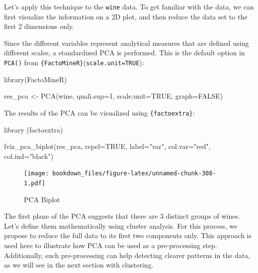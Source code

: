 \documentclass[
]{krantz}
\makeatletter
\newenvironment{Shaded}{\begin{snugshade}}{\end{snugshade}}
\newcommand{\AttributeTok}[1]{\textcolor[rgb]{0.61,0.61,0.61}{#1}}
\newcommand{\ConstantTok}[1]{\textcolor[rgb]{0,0,0}{#1}}
\newcommand{\DecValTok}[1]{\textcolor[rgb]{0.06,0.06,0.06}{#1}}
\newcommand{\FunctionTok}[1]{\textcolor[rgb]{0,0,0}{#1}}
\newcommand{\NormalTok}[1]{#1}
\newcommand{\OtherTok}[1]{\textcolor[rgb]{0.37,0.37,0.37}{#1}}
\newcommand{\StringTok}[1]{\textcolor[rgb]{0.5,0.5,0.5}{#1}}
\newenvironment{kframe}{%
\medskip{}
\setlength{\fboxsep}{.8em}
 \def\at@end@of@kframe{}%
 \ifinner\ifhmode%
  \def\at@end@of@kframe{\end{minipage}}%
  \begin{minipage}{\columnwidth}%
 \fi\fi%
 \def\FrameCommand##1{\hskip\@totalleftmargin \hskip-\fboxsep
 \colorbox{shadecolor}{##1}\hskip-\fboxsep
     \hskip-\linewidth \hskip-\@totalleftmargin \hskip\columnwidth}%
 \MakeFramed {\advance\hsize-\width
   \@totalleftmargin\z@ \linewidth\hsize
   \@setminipage}}%
 {\par\unskip\endMakeFramed%
 \at@end@of@kframe}
\renewenvironment{Shaded}{\begin{kframe}}{\end{kframe}}
\makeatother
\begin{document}
Let's apply this technique to the \texttt{wine} data. To get familiar with the data, we can first visualize the information on a 2D plot, and then reduce the data set to the first 2 dimensions only.

Since the different variables represent analytical measures that are defined using different scales, a standardized PCA is performed. This is the default option in \texttt{PCA()} from \texttt{\{FactoMineR\}}(\texttt{scale.unit=TRUE}):

\begin{Shaded}
\begin{Highlighting}[]
\FunctionTok{library}\NormalTok{(FactoMineR)}

\NormalTok{res\_pca }\OtherTok{\textless{}{-}} \FunctionTok{PCA}\NormalTok{(wine, }\AttributeTok{quali.sup=}\DecValTok{1}\NormalTok{, }\AttributeTok{scale.unit=}\ConstantTok{TRUE}\NormalTok{, }\AttributeTok{graph=}\ConstantTok{FALSE}\NormalTok{)}
\end{Highlighting}
\end{Shaded}

The results of the PCA can be visualized using \texttt{\{factoextra\}}:

\begin{Shaded}
\begin{Highlighting}[]
\FunctionTok{library}\NormalTok{ (factoextra)}

\FunctionTok{fviz\_pca\_biplot}\NormalTok{(res\_pca, }\AttributeTok{repel=}\ConstantTok{TRUE}\NormalTok{, }\AttributeTok{label=}\StringTok{"var"}\NormalTok{, }
                \AttributeTok{col.var=}\StringTok{"red"}\NormalTok{, }\AttributeTok{col.ind=}\StringTok{"black"}\NormalTok{)}
\end{Highlighting}
\end{Shaded}

\begin{figure}
\centering
\texttt{[image: bookdown\_files/figure-latex/unnamed-chunk-308-1.pdf]}
\caption{\label{fig:unnamed-chunk-308}PCA Biplot}
\end{figure}

The first plane of the PCA suggests that there are 3 distinct groups of wines. Let's define them mathematically using cluster analysis. For this process, we propose to reduce the full data to its first two components only. This approach is used here to illustrate how PCA can be used as a pre-processing step. Additionally, such pre-processing can help detecting clearer patterns in the data, as we will see in the next section with clustering.
\end{document}
